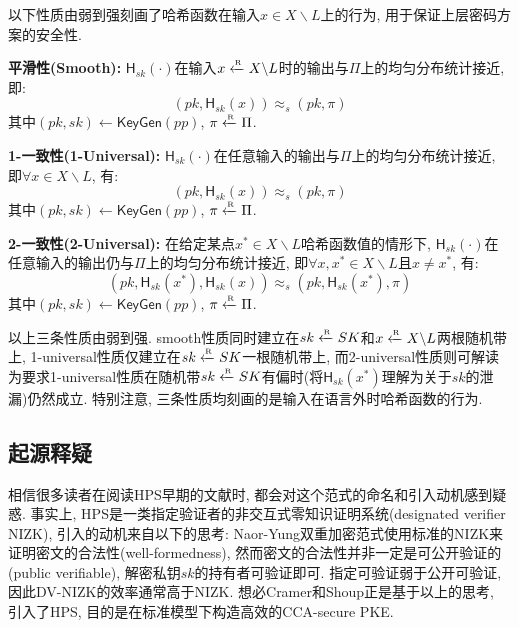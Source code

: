 以下性质由弱到强刻画了哈希函数在输入$x \in X \backslash L$上的行为, 用于保证上层密码方案的安全性.  

\begin{trivlist}
\item \textbf{平滑性(Smooth):} $\mathsf{H}_{sk}(\cdot)$在输入$x \xleftarrow{\textup{\tiny R}} X \backslash L$时的输出与$\Pi$上的均匀分布统计接近, 即: 
\begin{equation*}
    (pk, \mathsf{H}_{sk}(x)) \approx_s (pk, \pi)
\end{equation*}
其中$(pk, sk) \leftarrow \mathsf{KeyGen}(pp)$, $\pi \xleftarrow{\textup{\tiny R}} \Pi$.   


\item \textbf{1-一致性(1-Universal):} $\mathsf{H}_{sk}(\cdot)$在任意输入的输出与$\Pi$上的均匀分布统计接近, 
    即$\forall x \in X \backslash L$, 有:
\begin{equation*}
    (pk, \mathsf{H}_{sk}(x)) \approx_s (pk, \pi)
\end{equation*}
其中$(pk, sk) \leftarrow \mathsf{KeyGen}(pp)$, $\pi \xleftarrow{\textup{\tiny R}} \Pi$. 

\item \textbf{2-一致性(2-Universal):} 在给定某点$x^* \in X \backslash L$哈希函数值的情形下, 
    $\mathsf{H}_{sk}(\cdot)$在任意输入的输出仍与$\Pi$上的均匀分布统计接近, 
    即$\forall x, x^* \in X \backslash L$且$x \neq x^*$, 有:
\begin{equation*}
    (pk, \mathsf{H}_{sk}(x^*), \mathsf{H}_{sk}(x)) \approx_s (pk, \mathsf{H}_{sk}(x^*), \pi)
\end{equation*}
其中$(pk, sk) \leftarrow \mathsf{KeyGen}(pp)$, $\pi \xleftarrow{\textup{\tiny R}} \Pi$. 
\end{trivlist}

\begin{note}
以上三条性质由弱到强. 
smooth性质同时建立在$sk \xleftarrow{\textup{\tiny R}} SK$和$x \xleftarrow{\textup{\tiny R}} X \backslash L$两根随机带上, 
1-universal性质仅建立在$sk \xleftarrow{\textup{\tiny R}} SK$一根随机带上, 
而2-universal性质则可解读为要求1-universal性质在随机带$sk \xleftarrow{\textup{\tiny R}} SK$有偏时(将$\mathsf{H}_{sk}(x^*)$理解为关于$sk$的泄漏)仍然成立. 
特别注意, 三条性质均刻画的是输入在语言外时哈希函数的行为.
\end{note}

\subsection{起源释疑}
相信很多读者在阅读HPS早期的文献时, 都会对这个范式的命名和引入动机感到疑惑. 
事实上, HPS是一类指定验证者的非交互式零知识证明系统(designated verifier NIZK), 
引入的动机来自以下的思考: Naor-Yung双重加密范式使用标准的NIZK来证明密文的合法性(well-formedness), 
然而密文的合法性并非一定是可公开验证的(public verifiable), 解密私钥$sk$的持有者可验证即可. 
指定可验证弱于公开可验证, 因此DV-NIZK的效率通常高于NIZK. 
想必Cramer和Shoup正是基于以上的思考, 引入了HPS, 目的是在标准模型下构造高效的CCA-secure PKE. 

